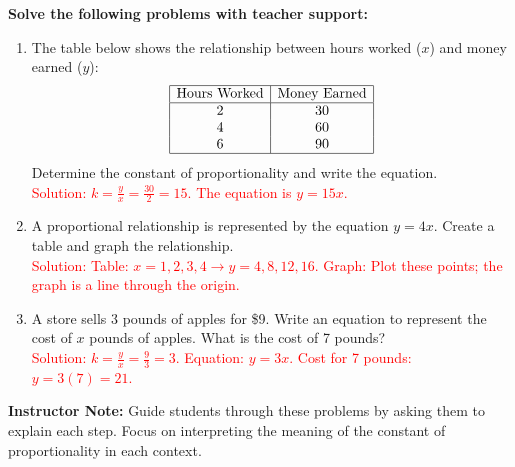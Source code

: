 \documentclass[12pt]{article}
\begin{document}
\begin{tcolorbox}[colframe=black!60, colback=white, 
coltitle=black, colbacktitle=black!15, fonttitle=\bfseries\Large, 
title=Guided Practice, halign title=center, left=10pt, right=10pt, top=10pt, bottom=15pt]
\textbf{Solve the following problems with teacher support:}
\begin{enumerate}[itemsep=5em]
    \item The table below shows the relationship between hours worked (\(x\)) and money earned (\(y\)):
    \[
    \begin{array}{|c|c|}
    \hline
    \text{Hours Worked} & \text{Money Earned} \\
    \hline
    2 & 30 \\
    4 & 60 \\
    6 & 90 \\
    \hline
    \end{array}
    \]
    Determine the constant of proportionality and write the equation. \\
    \textcolor{red}{Solution: \(k = \frac{y}{x} = \frac{30}{2} = 15\). The equation is \(y = 15x\).}
    \item A proportional relationship is represented by the equation \(y = 4x\). Create a table and graph the relationship. \\
    \textcolor{red}{Solution: Table: \(x = 1, 2, 3, 4 \rightarrow y = 4, 8, 12, 16\). Graph: Plot these points; the graph is a line through the origin.}
    \item A store sells 3 pounds of apples for \$9. Write an equation to represent the cost of \(x\) pounds of apples. What is the cost of 7 pounds? \\
    \textcolor{red}{Solution: \(k = \frac{y}{x} = \frac{9}{3} = 3\). Equation: \(y = 3x\). Cost for 7 pounds: \(y = 3(7) = 21\).}
\end{enumerate}

{\color{blue} \textbf{Instructor Note:} Guide students through these problems by asking them to explain each step. Focus on interpreting the meaning of the constant of proportionality in each context.}
\end{tcolorbox}

\vspace{1em}
\end{document}
